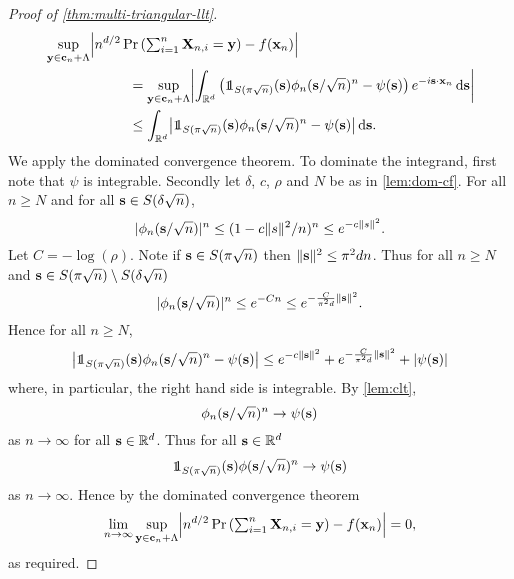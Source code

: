 \begin{proof}[Proof of \cref{thm:multi-triangular-llt}]
\begin{align*}
        &\sup_{\vy \in \vc_n + \lattice} \abs*{
            n^{d/2} \Pr\left( \textstyle \sum_{i=1}^n \vX_{n, i} = \vy \right) - f(\vx_n)
            } \nonumber \\
        &\hspace{6em} = \sup_{\vy \in \vc_n + \lattice} \abs*{
            \int_{\R^d} \left(\one_{S(\pi \sqrt{n})}(\vs) \phi_n(\vs/\sqrt{n})^n - \psi(\vs)\right) e^{-i\vs \cdot \vx_n} \dif \vs
            } \\
        &\hspace{6em} \leq \int_{\R^d} \abs*{ \one_{S(\pi \sqrt{n})}(\vs) \phi_n(\vs/\sqrt{n})^n - \psi(\vs)} \dif \vs.
    \end{align*}
    We apply the dominated convergence theorem. To dominate the integrand, first note that $\psi$ is integrable. Secondly let $\delta$, $c$, $\rho$ and $N$ be as in \cref{lem:dom-cf}. For all $n \geq N$ and for all ${\mathbf s} \in S(\delta \sqrt{n})$, 
    \begin{equation*}
        \lvert\phi_n({\mathbf s}/\sqrt{n})\rvert^n
        \leq (1 - c \lVert s\rVert^2/n)^n
        \leq e^{-c \lVert s\rVert^2}.
    \end{equation*}
    Let $C = - \log(\rho)$. Note if ${\mathbf s} \in S(\pi \sqrt{n})$ then $\lVert{\mathbf s}\rVert^2 \leq \pi^2 d n$. Thus for all $n \geq N$ and ${\mathbf s} \in S(\pi \sqrt{n}) \setminus S(\delta \sqrt{n})$
    \begin{equation*}
        \lvert\phi_n({\mathbf s}/\sqrt{n})\rvert^n
        \leq e^{-Cn} 
        \leq e^{- \frac{C}{\pi^2 d} \lVert{\mathbf s}\rVert^2}.
    \end{equation*}
    Hence for all $n \geq N$,
    \begin{equation*}
        \abs*{ \one_{S(\pi \sqrt{n})}(\vs) \phi_n(\vs/\sqrt{n})^n - \psi(\vs)}
        \leq e^{-c \norm{\vs}^2} + e^{- \frac{C}{\pi^2 d} \norm{\vs}^2} + \abs{\psi(\vs)}
    \end{equation*}
    where, in particular, the right hand side is integrable. By \cref{lem:clt},
    \begin{equation*}
        \phi_n({\mathbf s}/\sqrt{n})^n \to \psi({\mathbf s})
    \end{equation*}
    as $n \to \infty$ for all ${\mathbf s} \in {\mathbb R}^d$. Thus for all ${\mathbf s} \in {\mathbb R}^d$
    \begin{equation*}
        \one_{S(\pi\sqrt{n})}(\vs) \phi(\vs/\sqrt{n})^n \to \psi(\vs)
    \end{equation*}
    as $n \to \infty$. Hence by the dominated convergence theorem
    \begin{equation*}
        \lim_{n \to \infty} \sup_{\vy \in \vc_n + \lattice} \abs*{
            n^{d/2} \Pr\left( \textstyle \sum_{i=1}^n \vX_{n, i} = \vy \right) - f(\vx_n)
            } = 0,
    \end{equation*}
    as required.


\end{proof}
